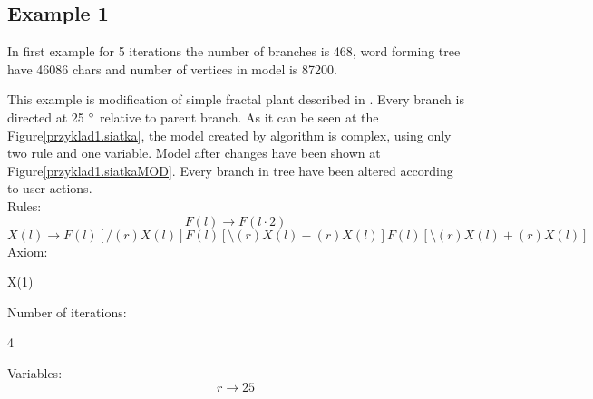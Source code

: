 \documentclass[b5paper,twoside,11pt]{article}
\renewcommand{\figurename}{Figure}
\begin{document}
\subsection*{Example 1}
In first example for 5 iterations the number of branches is 468, word forming tree have 46086 chars and number of vertices in model is 87200.\par
This example is modification of simple fractal plant described in \cite{prusinABOP}.
Every branch is directed at 25  $\degree$ relative to parent branch. As it can be seen at the \figurename \ref{przyklad1.siatka}, the model created by algorithm is complex, using only two rule and one variable. Model after changes have been shown at  \figurename \ref{przyklad1.siatkaMOD}. Every branch in tree have been altered according to user actions.\\ 
Rules: \newline
\begin{equation}
F(l)\rightarrow F(l\cdot2) 
\end{equation}
\begin{equation}
X(l) \rightarrow F(l)[/(r)X(l)]F(l)[\setminus(r)X(l)-(r)X(l)]F(l)[\setminus(r)X(l)+(r)X(l)] 
\end{equation}
Axiom:
\begin{center}
X(1)
\end{center}
Number of iterations:
\begin{center}
4
\end{center}
Variables:
\begin{equation}
r\rightarrow 25
\end{equation}
\end{document}
